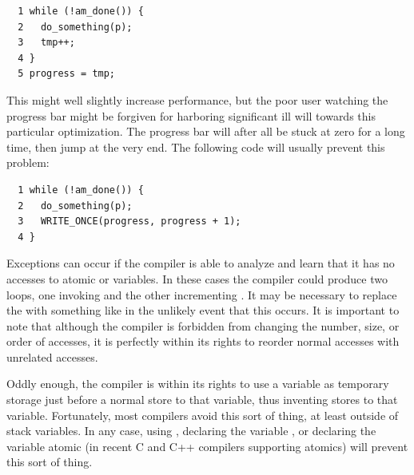 \vspace{5pt}
\begin{minipage}[t]{\columnwidth}
\scriptsize
\begin{verbatim}
  1 while (!am_done()) {
  2   do_something(p);
  3   tmp++;
  4 }
  5 progress = tmp;
\end{verbatim}
\end{minipage}
\vspace{5pt}

This might well slightly increase performance, but the poor user
watching the progress bar might be forgiven for harboring significant
ill will towards this particular optimization.
The progress bar will after all be stuck at zero for a long time,
then jump at the very end.
The following code will usually prevent this problem:

\vspace{5pt}
\begin{minipage}[t]{\columnwidth}
\scriptsize
\begin{verbatim}
  1 while (!am_done()) {
  2   do_something(p);
  3   WRITE_ONCE(progress, progress + 1);
  4 }
\end{verbatim}
\end{minipage}
\vspace{5pt}

Exceptions can occur if the compiler is able to analyze 
and learn that it has no accesses to atomic or  variables.
In these cases the compiler could produce two loops, one invoking
 and the other incrementing .
It may be necessary to replace the  with something
like  in the unlikely event that this occurs.
It is important to note that although the compiler is forbidden from
changing the number, size, or order of  accesses, it is
perfectly within its rights to reorder normal accesses with unrelated
 accesses.

Oddly enough, the compiler is within its rights to use a variable
as temporary storage just before a normal store to that variable, thus
inventing stores to that variable.
Fortunately, most compilers avoid this sort of thing, at least outside
of stack variables.
In any case, using , declaring the variable
, or declaring the variable atomic (in recent C and C++
compilers supporting atomics) will prevent this sort of thing.

